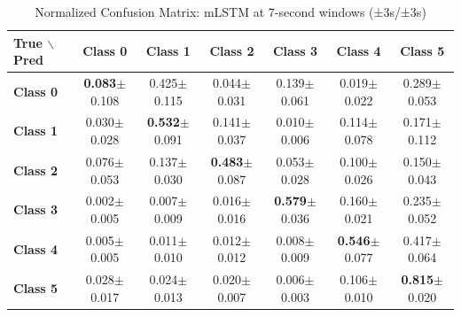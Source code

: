 \begin{table}[htbp]
\centering
\caption{Normalized Confusion Matrix: mLSTM at 7-second windows (±3s/±3s)}
\label{tab:app_cm_mlstm_7s}
\small
\setlength{\tabcolsep}{2pt}
\begin{tabular}{lcccccc}
	\toprule
	\textbf{True $\backslash$ Pred} & \textbf{Class 0} & \textbf{Class 1} & \textbf{Class 2} & \textbf{Class 3} & \textbf{Class 4} & \textbf{Class 5} \\
\midrule
	\textbf{Class 0} & \textbf{0.083}$\pm$0.108 & 0.425$\pm$0.115 & 0.044$\pm$0.031 & 0.139$\pm$0.061 & 0.019$\pm$0.022 & 0.289$\pm$0.053 \\
	\textbf{Class 1} & 0.030$\pm$0.028 & \textbf{0.532}$\pm$0.091 & 0.141$\pm$0.037 & 0.010$\pm$0.006 & 0.114$\pm$0.078 & 0.171$\pm$0.112 \\
	\textbf{Class 2} & 0.076$\pm$0.053 & 0.137$\pm$0.030 & \textbf{0.483}$\pm$0.087 & 0.053$\pm$0.028 & 0.100$\pm$0.026 & 0.150$\pm$0.043 \\
	\textbf{Class 3} & 0.002$\pm$0.005 & 0.007$\pm$0.009 & 0.016$\pm$0.016 & \textbf{0.579}$\pm$0.036 & 0.160$\pm$0.021 & 0.235$\pm$0.052 \\
	\textbf{Class 4} & 0.005$\pm$0.005 & 0.011$\pm$0.010 & 0.012$\pm$0.012 & 0.008$\pm$0.009 & \textbf{0.546}$\pm$0.077 & 0.417$\pm$0.064 \\
	\textbf{Class 5} & 0.028$\pm$0.017 & 0.024$\pm$0.013 & 0.020$\pm$0.007 & 0.006$\pm$0.003 & 0.106$\pm$0.010 & \textbf{0.815}$\pm$0.020 \\
\bottomrule
\end{tabular}
\setlength{\tabcolsep}{6pt}
\end{table}

